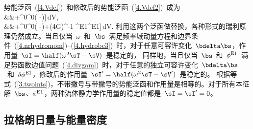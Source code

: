 {势能泛函~(\ref{4.Vdef})~和修改后的势能泛函~(\ref{4.Vdef2})~成为
%
%
\eqa
\label{4.Vhydrodef}
\lefteqn{\sV=\int_{\subearth}
[\beps\!:\!\bGamma\!:\!\beps
+\rho^0\bs\cdot\bdel\phi^{\rm E1}+\rho^0
\bs\cdot\bdel\bdel\phi^0\cdot\bs} \nonumber \\
&&\mbox{}\qquad\qquad\qquad\qquad+\rho^0\bdel\phi^0\cdot(\bs\cdot\bdel\bs
-\bs\bdel\cdot\bs)]\,dV,
\ena
\eqa
\label{4.Vhydrodef2}
\lefteqn{\sV'=\int_{\subspace}
[\beps\!:\!\bGamma\!:\!\beps
+2\rho^0\bs\cdot\bdel\phi^{\rm E1}+\rho^0
\bs\cdot\bdel\bdel\phi^0\cdot\bs} \\
&&\mbox{}+\rho^0\bdel\phi^0\cdot(\bs\cdot\bdel\bs
-\bs\bdel\cdot\bs)+(4\pi G)^{-1}
\bdel\phi^{\rm E1}\cdot\bdel\phi^{\rm E1}]\,dV. \nonumber
\ena
利用这两个泛函做替换，各种形式的瑞利原理仍然成立。当且仅当~$\omega$~和~$\bs$~满足频率域动量方程和边界条件~(\ref{4.nrhydromom})--(\ref{4.hydrobc3})~时，对于任意可容许变化~$\bdelta\bs$，作用量~$\sI=\half(\omega^2\sT-\sV)$~是稳定的，
%
同样地，当且仅当~$\bs$~和~$\phi^{\rm E1}$~满足势函数边值问题~(\ref{4.divgam})~时，对于任意的独立可容许变化~$\bdelta\bs$~和~$\delta\phi^{\rm E1}$，修改后的作用量~$\sI'=\half(\omega^2\sT-\sV')$~是稳定的。
%
%
根据等式~(\ref{3.twoints})，不带撇号与带撇号的势能泛函和作用量是相等的。对于所有本征解~$\bs$、$\phi^{\rm E1}$，两种流体静力学作用量的稳定值都是~$\sI=\sI'=0$。
%

\subsection{拉格朗日量与能量密度}
%
%

}
